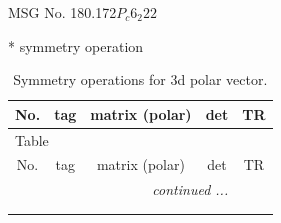 \documentclass[fleqn,8pt]{jsarticle}
\begin{document}
\setcounter{MaxMatrixCols}{32}

\renewcommand{\tablename}{Table~}
\renewcommand{\figurename}{Figure~}
\begin{center}
\LARGE
MSG No. 180.172\quad$P_{c}6_{2}22$
\end{center}
* symmetry operation
\renewcommand{\arraystretch}{1.3}
\begin{longtable}{ccccc}
\caption{Symmetry operations for 3d polar vector.}
 \\
 \hline \hline
No. & tag & matrix (polar) & det & TR \\ \hline \endfirsthead

\multicolumn{4}{l}{\tablename\ \thetable{}} \\
 \hline \hline
No. & tag & matrix (polar) & det & TR \\ \hline \endhead

 \hline \hline
\multicolumn{4}{r}{\footnotesize\it continued ...} \\ \endfoot

 \hline \hline
\multicolumn{4}{r}{} \\ \endlastfoot


\end{longtable}
\end{document}
